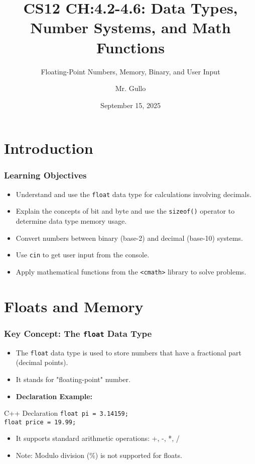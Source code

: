 \documentclass{beamer}
\title[Number Systems and Math]{CS12 CH:4.2-4.6: Data Types, Number Systems, and Math Functions}
\subtitle{Floating-Point Numbers, Memory, Binary, and User Input}
\author[Mr. Gullo]{Mr. Gullo}
\date[Sep 15, 2025]{September 15, 2025}
\begin{document}
\frame{\titlepage}

\section{Introduction}

\begin{frame}
\frametitle{Learning Objectives}
\begin{itemize}
    \item Understand and use the \texttt{float} data type for calculations involving decimals.
    \item Explain the concepts of \alert{bit} and \alert{byte} and use the \texttt{sizeof()} operator to determine data type memory usage.
    \item Convert numbers between binary (base-2) and decimal (base-10) systems.
    \item Use \texttt{cin} to get user input from the console.
    \item Apply mathematical functions from the \texttt{<cmath>} library to solve problems.
\end{itemize}
\end{frame}

\section{Floats and Memory}

\begin{frame}
\frametitle{Key Concept: The \texttt{float} Data Type}
\begin{itemize}
    \item The \texttt{float} data type is used to store numbers that have a fractional part (decimal points).
    \item It stands for "floating-point" number.
    \item \textbf{Declaration Example:}
\end{itemize}
\begin{block}{C++ Declaration}
\texttt{float pi = 3.14159;} \\
\texttt{float price = 19.99;}
\end{block}
\begin{itemize}
    \item It supports standard arithmetic operations: +, -, *, /
    \item \alert{Note:} Modulo division (\%) is not supported for floats.
\end{itemize}
\end{frame}
\end{document}
